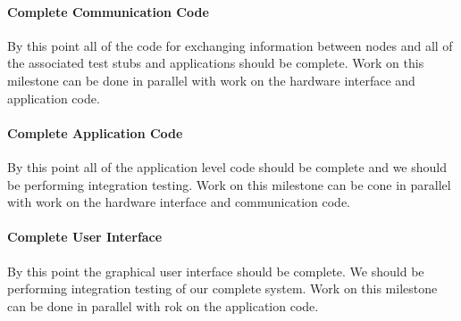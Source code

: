\paragraph{Complete Communication Code}
By this point all of the code for exchanging information between nodes and all
of the associated test stubs and applications should be complete. Work on this
milestone can be done in parallel with work on the hardware interface and
application code.

\paragraph{Complete Application Code}
By this point all of the application level code should be complete and we should
be performing integration testing. Work on this milestone can be cone in
parallel with work on the hardware interface and communication code.

\paragraph{Complete User Interface}
By this point the graphical user interface should be complete. We should be
performing integration testing of our complete system. Work on this milestone
can be done in parallel with rok on the application code.

